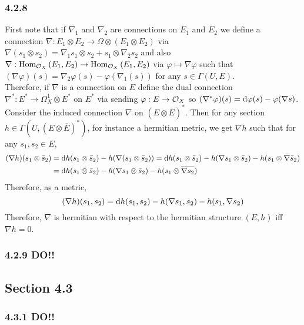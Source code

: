 \documentclass[12pt]{article}
\begin{document}
\subsubsection{4.2.8}

First note that if $\nabla_1$ and $\nabla_2$ are connections on $E_1$ and $E_2$ we define a connection $\nabla : E_1 \otimes E_2 \to \Omega \otimes (E_1 \otimes E_2)$ via $\nabla (s_1 \otimes s_2)  = \nabla_1 s_1 \otimes s_2 + s_1 \otimes \nabla_2 s_2$ and also $\nabla : \mathrm{Hom}_{\mathcal{O}_{X}} \left( E_1, E_2 \right) \to \mathrm{Hom}_{\mathcal{O}_{X}} \left( E_1, E_2 \right)$ via $\varphi \mapsto \nabla \varphi$ such that $(\nabla \varphi)(s) = \nabla_2 \varphi(s) - \varphi(\nabla_1(s))$ for any $s \in \Gamma(U, E)$.
\bigskip\\
Therefore, if $\nabla$ is a connection on $E$ define the dual connection $\nabla^* : E^* \to \Omega^1_X \otimes E^*$ on $E^*$ via sending $\varphi : E \to \mathcal{O}_{X}$ so $(\nabla^* \varphi)(s) = \mathrm{d}{\varphi(s)} - \varphi(\nabla s)$.
\bigskip\\
Consider the induced connection $\nabla$ on $(E \otimes \overline{E})^*$. Then for any section $h \in \Gamma(U, (E \otimes \overline{E})^*)$, for instance a hermitian metric, we get $\nabla h$ such that for any $s_1, s_2 \in E$,
\begin{align*}
(\nabla h)(s_1 \otimes \bar{s}_2) & = \mathrm{d}{h(s_1 \otimes \bar{s}_2)} - h(\nabla (s_1 \otimes \bar{s}_2)) = \mathrm{d}{h(s_1 \otimes \bar{s}_2)} - h(\nabla s_1 \otimes \bar{s}_2) - h(s_1 \otimes \bar{\nabla} \bar{s}_2) 
\\
& = \mathrm{d}{h(s_1 \otimes \bar{s}_2)} - h(\nabla s_1 \otimes \bar{s}_2) - h(s_1 \otimes \overline{\nabla s_2}) 
\end{align*}
Therefore, as a metric,
\[ (\nabla h)(s_1, s_2) = \mathrm{d}{h(s_1, s_2)} - h(\nabla s_1, s_2) - h(s_1, \nabla s_2) \]
Therefore, $\nabla$ is hermitian with respect to the hermitian structure $(E, h)$ iff $\nabla h = 0$.

\subsubsection{4.2.9 DO!!}

\subsection{Section 4.3}

\subsubsection{4.3.1 DO!!}
\end{document}
